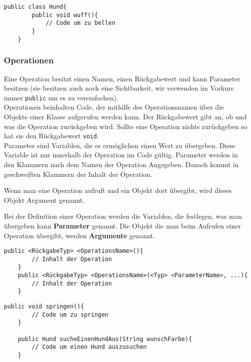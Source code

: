 \begin{lstlisting}[title=\textbf{Klassen Beispiel}]
	public class Hund{
		public void wuff(){
			// Code um zu bellen
		}
	}
\end{lstlisting}
\begin{Infobox}
	\subsubsection*{Operationen}
	Eine Operation besitzt einen Namen, einen Rückgabewert und kann Parameter besitzen (sie besitzen auch noch eine Sichtbarkeit, wir verwenden im Vorkurs immer \lstinline{public} um es zu vereinfachen).\\
	Operationen beinhalten Code, der mithilfe des Operationsnamen über die Objekte einer Klasse aufgerufen werden kann.
	Der Rückgabewert gibt an, ob und was die Operation zurückgeben wird.
	Sollte eine Operation nichts zurückgeben so hat sie den Rückgabewert \lstinline{void}.\\
	Parameter sind Variablen, die es ermöglichen einen Wert zu übergeben. Diese Variable ist nur innerhalb der Operation im Code gültig.
	Parameter werden in den Klammern nach dem Namen der Operation Angegeben.
	Danach kommt in geschweiften Klammern der Inhalt der Operation.
	
	Wenn man eine Operation aufruft und ein Objekt dort übergibt, wird dieses Objekt Argument genannt.
\end{Infobox}
\vspace{5mm}

\begin{Infobox}
	Bei der Definition einer Operation werden die Variablen, die festlegen, was man übergeben kann \textbf{Parameter} genannt. Die Objekt die man beim Aufrufen einer Operation übergibt, werden \textbf{Argumente} genannt. 
\end{Infobox}

\begin{lstlisting}[title=\textbf{Operations Syntax}]
	public <RückgabeTyp> <OperationsName>(){
		// Inhalt der Operation
	}
	public <RückgabeTyp> <OperationsName>(<Typ> <ParameterName>, ...){
		// Inhalt der Operation
	}
\end{lstlisting}

\begin{lstlisting}[title=\textbf{Operations Beispiel}]
	public void springen(){
		// Code um zu springen
	}
	
	public Hund sucheEinenHundAus(String wunschFarbe){
		// Code um einen Hund auszusuchen
	}
\end{lstlisting}

